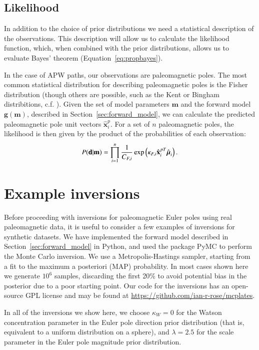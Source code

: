 \documentclass[preprint,12pt,authoryear]{elsarticle}
\newcommand{\mitbf}[1]{\hbox{\mathversion{bold}$#1$}}
\begin{document}
\subsection{Likelihood}
\label{sec:likelihood}
In addition to the choice of prior distributions we need a statistical description of the observations.
This description will allow us to calculate the likelihood function, which, when combined with the prior distributions,
allows us to evaluate Bayes' theorem (Equation~\eqref{eq:propbayes}).

In the case of APW paths, our observations are paleomagnetic poles.
The most common statistical distribution for describing paleomagnetic poles is the Fisher distribution
(though others are possible, such as the Kent or Bingham distribitions, c.f. \citet{tauxe2010essentials}).
Given the set of model parameters $\mathbf{m}$ and the forward model $\mathbf{g}(\mathbf{m})$, described
in Section~\ref{sec:forward_model}, we can calculate the predicted paleomagnetic pole unit vectors $\hat{\mathbf{x}}_i^p$.
For a set of $n$ paleomagnetic poles, the likelihood is then given by the product of the probabilities
of each observation:
\begin{equation}
P(\mathbf{d} \vert \mathbf{m}) = \displaystyle\prod_{i=1}^n \frac{1}{C_{F,i}} \exp \left( \kappa_{F,i} \hat{\mathbf{x}}_{i}^{pT} \hat{\mitbf{\mu}}_i \right).
\label{eq:model_likelihood}
\end{equation}

\section{Example inversions}
\label{sec:example_inversion}

Before proceeding with inversions for paleomagnetic Euler poles using real paleomagnetic data,
it is useful to consider a few examples of inversions for synthetic datasets.
We have implemented the forward model described in Section~\ref{sec:forward_model}
in Python, and used the package PyMC \citep{patil2010pymc} to perform the Monte Carlo inversion.
We use a Metropolis-Hastings sampler, starting from a fit to the maximum a posteriori (MAP) probability.
In most cases shown here we generate $10^6$ samples, discarding the first 20\% to avoid
potential bias in the posterior due to a poor starting point.
Our code for the inversions has an open-source GPL license and may be found at \url{https://github.com/ian-r-rose/mcplates}.

In all of the inversions we show here, we choose $\kappa_W=0$ for the Watson concentration parameter
in the Euler pole direction prior distribution (that is, equivalent to a uniform distribution on a sphere),
and $\lambda=2.5$ for the scale parameter in the Euler pole magnitude prior distribution.
\end{document}
